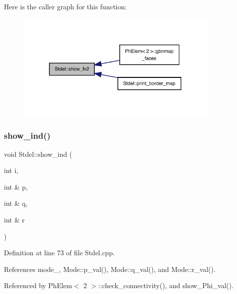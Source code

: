 Here is the caller graph for this function\+:
\nopagebreak
\begin{figure}[H]
\begin{center}
\leavevmode
\includegraphics[width=282pt]{classStdel_a67f16a65f02fc8a5aa10274539bd1ad8_icgraph}
\end{center}
\end{figure}
\mbox{\label{classStdel_a20afd536025caf1aad1c4e3f41fcb866}} 
\subsubsection{\texorpdfstring{show\+\_\+ind()}{show\_ind()}}
{\footnotesize\ttfamily void Stdel\+::show\+\_\+ind (\begin{DoxyParamCaption}\item[{int}]{i,  }\item[{int \&}]{p,  }\item[{int \&}]{q,  }\item[{int \&}]{r }\end{DoxyParamCaption})}



Definition at line 73 of file Stdel.\+cpp.



References mode\+\_\+, Mode\+::p\+\_\+val(), Mode\+::q\+\_\+val(), and Mode\+::r\+\_\+val().



Referenced by Ph\+Elem$<$ 2 $>$\+::check\+\_\+connectivity(), and show\+\_\+\+Phi\+\_\+val().

